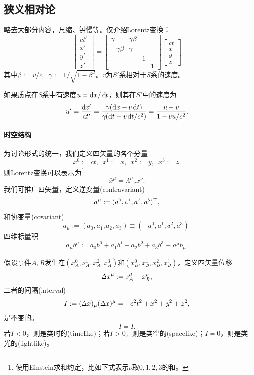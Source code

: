 \subsection{狭义相对论}
略去大部分内容，尺缩、钟慢等。仅介绍Lorentz变换：%
\begin{equation}
	\begin{bmatrix}
		ct'\\x'\\y'\\z'
	\end{bmatrix}=
	\begin{bmatrix}
		\gamma&\gamma\beta\\-\gamma\beta&\gamma\\ &&1\\ &&&1
	\end{bmatrix}
	\begin{bmatrix}
		ct\\x\\y\\z
	\end{bmatrix}
\end{equation}
其中$\beta:=v/c,\enspace\gamma:=1/\sqrt{1-\beta^2}$。$v$为$S'$系相对于$S$系的速度。

如果质点在$S$系中有速度$u=\mathop{}\!\mathrm{d} x/\mathop{}\!\mathrm{d} t$，则其在$S'$中的速度为
\[
    u'=\dv{x'}{t'}=\frac{\gamma(\d x-v\d t)}{\gamma(\d t-v\d t/c^2)}=\frac{u-v}{1-vu/c^2}.
\]
\paragraph{时空结构}
为讨论形式的统一，我们定义四矢量的各个分量
\[
    x^0:=ct,\enspace x^1:=x,\enspace x^2:=y,\enspace x^3:=z.
\]
则Lorentz变换可以表示为\footnote{使用Einstein求和约定，比如下式表示$\nu$取$0,1,2,3$的和。}
\[
    \bar x^\mu=\Lambda^\mu{}_\nu x^\nu.
\]
我们可推广四矢量，定义逆变量(contravariant)
\[
    a^\mu:=(a^0,a^1,a^2,a^3)^\top,
\]
和协变量(covariant)
\[
    a_\mu:=(a_0,a_1,a_2,a_3)\equiv(-a^0,a^1,a^2,a^3).
\]
四维标量积
\[
    a_\mu b^\mu:=a_0b^0+a_1b^1+a_2b^2+a_3b^3\equiv a^\mu b_\mu.
\]

假设事件$A,B$发生在$(x_A^0,x_A^1,x_A^2,x_A^3)$和$(x_B^0,x_B^1,x_B^2,x_B^3)$，定义四矢量位移
\[
    \Delta x^\mu:=x_A^\mu-x_B^\mu,
\]
二者的间隔(interval)
\[
    I:=(\Delta x)_\mu(\Delta x)^\mu=-c^2t^2+x^2+y^2+z^2,
\]
是不变的。
\[
    \bar I=I.
\]
若$I<0$，则是类时的(timelike)；若$I>0$，则是类空的(spacelike)；$I=0$，则是类光的(lightlike)。

